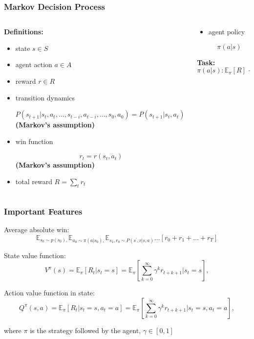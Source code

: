 \documentclass[fullscreen=true, bookmarks=true, hyperref={pdfencoding=unicode}]{beamer}
\begin{document}
\begin{frame}
  \frametitle{Markov Decision Process}

\begin{columns}
    \begin{column}{.6\paperwidth}
      {\bf Definitions:}
      \begin{itemize}
        \item state $s \in S$
        \item agent action $a \in A$
        \item reward $r \in R$
        \item transition dynamics

         $ P(s_{t+1} | s_t, a_t, \dots, s_{t-i}, a_{t-i}, \dots, s_0, a_0) = P(s_{t+1} | s_t, a_t)$
         {\bf (Markov's assumption)}

        \item win function

         $$ r_{t} = r(s_t, a_t)$$ {\bf (Markov's assumption)}
        \item total reward $R = \sum\limits_t r_t $
      \end{itemize}
    \end{column}
    \begin{column}{.3\paperwidth}

      \begin{itemize}
        \item agent policy

        $$ \pi (a | s) $$
      \end{itemize}
      {\bf Task:}
      $$ \pi (a | s): \mathbb{E}_\pi [R] \to \max $$
    \end{column}
  \end{columns}
\end{frame}


\begin{frame}
  \frametitle{Important Features}
    Average absolute win:
    $$ \mathbb{E}_{s_0 \sim p(s_0),} \mathbb{E}_{a_0 \sim \pi(a|s_0),} \mathbb{E}_{s_1, r_0 \sim P (s^\prime,r|s, a)} \dots \left[r_0 + r_1 + \dots + r_T \right]$$

    State value function:
    $$ V^{\pi} (s) = \mathbb{E}_\pi [R_t|s_t = s] =
    \mathbb{E}_\pi \left[\sum\limits_{k=0}^\infty \gamma^k r_{t+k+1} | s_t = s\right],$$

    Action value function in state:
    $$ Q^{\pi} (s, a) = \mathbb{E}_\pi [R_t|s_t = s, a_t = a] =
    \mathbb{E}_\pi \left[\sum\limits_{k=0}^\infty \gamma^k r_{t+k+1} | s_t = s, a_t = a \right],$$

    where $\pi$ is the strategy followed by the agent, $\gamma \in [0, 1]$
\end{frame}
\end{document}
